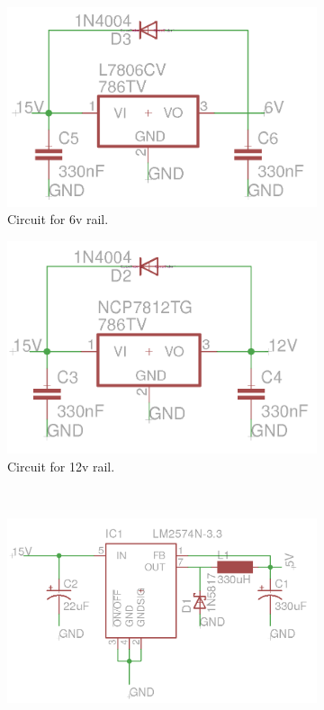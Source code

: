 \begin{figure}[h!]
	\begin{subfigure}{.48\linewidth}
		\includegraphics[width=\linewidth]{images/linear6v}
		\caption{Circuit for 6v rail.}
		\label{fig:psu6v}
	\end{subfigure}
	\begin{subfigure}{.48\linewidth}
		\includegraphics[width=\linewidth]{images/linear12v}
		\caption{Circuit for 12v rail.}
		\label{fig:psu12v}
	\end{subfigure}\\
	\begin{subfigure}{\linewidth}
		\includegraphics[width=\linewidth]{images/switch5v}

\end{subfigure}
\end{figure}
